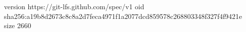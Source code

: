 version https://git-lfs.github.com/spec/v1
oid sha256:a19b8d2673c8c8a2d7feca4971f1a2077dcd859578c268803348f327f4f9421e
size 2660
